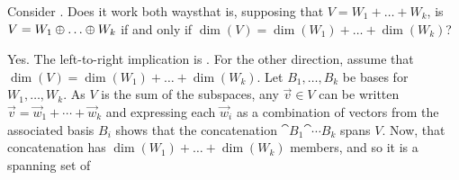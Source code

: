 \begin{exercises}
  \recommended \item 
    Consider .
    Does it work both ways\Dash that is,
    supposing that \( V=W_1+\dots+ W_k \),
    is \( V=W_1\directsum\dots\directsum W_k \) if and only if
    \( \dim(V)=\dim(W_1)+\dots+\dim(W_k) \)?
    \begin{answer}
      Yes.
      The left-to-right implication is
      .
      For the other direction,
      assume that \( \dim(V)=\dim(W_1)+\dots+\dim(W_k) \).
      Let \( B_1,\dots, B_k \) be bases for \( W_1,\dots, W_k \).
      As $V$ is the sum of the subspaces, any \( \vec{v}\in V \) can be written
      \( \vec{v}=\vec{w}_1+\cdots+\vec{w}_k \) and expressing each
      \( \vec{w}_i \) as a combination of vectors from the associated
      basis \( B_i \) shows that the concatenation
      \( \cat{B_1}{\cat{\cdots}{B_k}}  \) spans \( V \).
      Now, that concatenation has
      \( \dim(W_1)+\dots+\dim(W_k) \) members, and so it is a spanning set of 

\end{answer}
\end{exercises}
